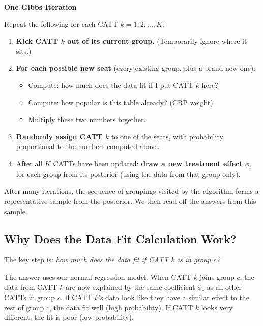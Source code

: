 \documentclass[12pt]{article}
\begin{document}
\begin{examplebox}
\textbf{One Gibbs Iteration}

Repeat the following for each CATT $k = 1, 2, \ldots, K$:

\begin{enumerate}
  \item \textbf{Kick CATT $k$ out of its current group.} (Temporarily ignore
    where it sits.)

  \item \textbf{For each possible new seat} (every existing group, plus a brand
    new one):
    \begin{itemize}[nosep]
      \item Compute: how much does the data fit if I put CATT $k$ here?
      \item Compute: how popular is this table already? (CRP weight)
      \item Multiply these two numbers together.
    \end{itemize}

  \item \textbf{Randomly assign CATT $k$} to one of the seats, with probability
    proportional to the numbers computed above.

  \item After all $K$ CATTs have been updated: \textbf{draw a new treatment
    effect $\phi_l$} for each group from its posterior (using the data from
    that group only).
\end{enumerate}
\end{examplebox}

After many iterations, the sequence of groupings visited by the algorithm
forms a representative sample from the posterior. We then read off the answers
from this sample.

\subsection{Why Does the Data Fit Calculation Work?}

The key step is: \textit{how much does the data fit if CATT $k$ is in group $c$?}

The answer uses our normal regression model. When CATT $k$ joins group $c$,
the data from CATT $k$ are now explained by the same coefficient $\phi_c$ as
all other CATTs in group $c$. If CATT $k$'s data look like they have a similar
effect to the rest of group $c$, the data fit well (high probability). If
CATT $k$ looks very different, the fit is poor (low probability).
\end{document}
